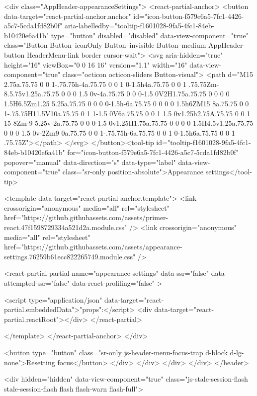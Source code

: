                <div class="AppHeader-appearanceSettings">
    <react-partial-anchor>
      <button data-target="react-partial-anchor.anchor" id="icon-button-f579e6a5-7fc1-4426-a5c7-5cda1fd82b0f" aria-labelledby="tooltip-f1601028-9fa5-4fc1-84eb-b10420e6a41b" type="button" disabled="disabled" data-view-component="true" class="Button Button--iconOnly Button--invisible Button--medium AppHeader-button HeaderMenu-link border cursor-wait">  <svg aria-hidden="true" height="16" viewBox="0 0 16 16" version="1.1" width="16" data-view-component="true" class="octicon octicon-sliders Button-visual">
    <path d="M15 2.75a.75.75 0 0 1-.75.75h-4a.75.75 0 0 1 0-1.5h4a.75.75 0 0 1 .75.75Zm-8.5.75v1.25a.75.75 0 0 0 1.5 0v-4a.75.75 0 0 0-1.5 0V2H1.75a.75.75 0 0 0 0 1.5H6.5Zm1.25 5.25a.75.75 0 0 0 0-1.5h-6a.75.75 0 0 0 0 1.5h6ZM15 8a.75.75 0 0 1-.75.75H11.5V10a.75.75 0 1 1-1.5 0V6a.75.75 0 0 1 1.5 0v1.25h2.75A.75.75 0 0 1 15 8Zm-9 5.25v-2a.75.75 0 0 0-1.5 0v1.25H1.75a.75.75 0 0 0 0 1.5H4.5v1.25a.75.75 0 0 0 1.5 0v-2Zm9 0a.75.75 0 0 1-.75.75h-6a.75.75 0 0 1 0-1.5h6a.75.75 0 0 1 .75.75Z"></path>
</svg>
</button><tool-tip id="tooltip-f1601028-9fa5-4fc1-84eb-b10420e6a41b" for="icon-button-f579e6a5-7fc1-4426-a5c7-5cda1fd82b0f" popover="manual" data-direction="s" data-type="label" data-view-component="true" class="sr-only position-absolute">Appearance settings</tool-tip>

      <template data-target="react-partial-anchor.template">
        <link crossorigin="anonymous" media="all" rel="stylesheet" href="https://github.githubassets.com/assets/primer-react.47f1598729334a521d2a.module.css" />
<link crossorigin="anonymous" media="all" rel="stylesheet" href="https://github.githubassets.com/assets/appearance-settings.76259b61ecc822265749.module.css" />

<react-partial
  partial-name="appearance-settings"
  data-ssr="false"
  data-attempted-ssr="false"
  data-react-profiling="false"
>
  
  <script type="application/json" data-target="react-partial.embeddedData">{"props":{}}</script>
  <div data-target="react-partial.reactRoot"></div>
</react-partial>

      </template>
    </react-partial-anchor>
  </div>

          <button type="button" class="sr-only js-header-menu-focus-trap d-block d-lg-none">Resetting focus</button>
        </div>
      </div>
    </div>
  </div>
</header>

      <div hidden="hidden" data-view-component="true" class="js-stale-session-flash stale-session-flash flash flash-warn flash-full">
  
